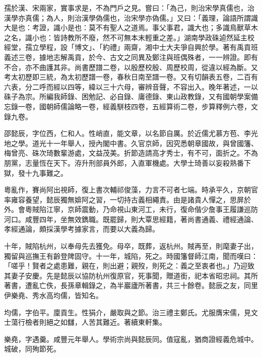 \begin{pinyinscope}
孺於漢、宋兩家，實事求是，不為門戶之見。嘗曰：「為己，則治宋學真儒也，治漢學亦真儒；為人，則治漢學偽儒也，治宋學亦偽儒。」又曰：「義理，論語所謂識大是也：考證，識小是也：莫不有聖人之道焉。事父事君，識大也；多識鳥獸草木之名，識小也：皆詩教所不廢，然不可無本末輕重之差。」湖南學政硃逌然延主校經堂，孺立學程，設「博文」、「約禮」兩齋，湘中士大夫爭自興於學。著有禹貢班義述三卷，據地志解禹貢，於今、古文之同異及鄭注與班偶殊者，一一辨證。即有不合，亦不曲護其非。尚書歷譜二卷，以殷歷校殷、周歷校周，從違以經為斷。又考太初歷即三統，為太初歷譜一卷，春秋日南至譜一卷。又有切韻表五卷，二百有六表，分二呼而經以四等，緯以三十六母，審辨音聲，不容出入。晚年著述，一以硃子為宗。所編我師錄、困勉記、必自錄、庸德錄、東山政教錄，又有國朝學案備忘錄一卷，國朝師儒論略一卷，經義駢枝四卷，五經算術二卷，步算釋例六卷，文錄九卷。

邵懿辰，字位西，仁和人。性峭直，能文章，以名節自厲。於近儒尤慕方苞、李光地之學。道光十一年舉人，授內閣中書。久官京師，因究悉朝章國故，與曾國籓、梅曾亮、硃次琦數輩游處，文益茂美。折節造請高才秀士，有不可，面折之。不為朋黨，志量恆在天下。洊升刑部員外郎，入直軍機處。大學士琦善以妄殺熟番下獄，發十九事難之。

粵亂作，賽尚阿出視師，復上書次輔祁俊藻，力言不可者七端。時承平久，京朝官率雍容養望，懿辰獨無媕阿之習，一切持古義相繩責。由是諸貴人憚之，思屏於外。會粵賊陷江寧，京師震動，乃命視山東河工，未行，復命偕少詹事王履謙巡防河口。咸豐四年，坐無效鐫職。既罷歸，則大覃思經籍，著尚書通義、禮經通論、孝經通論，頗採漢學考據家言，而要以大義為歸。

十年，賊陷杭州，以奉母先去獲免。母卒，既葬，返杭州。賊再至，則麾妻子出，獨留與巡撫王有齡登陴固守。十一年，城陷，死之。時國籓督師江南，聞而嘆曰：「嗟乎！賢者之處患難，親在，則出避；親歿，則死之：義之至衷者也。」乃迎致其妻子安慶。先是懿辰以協防杭州復原官，死事聞，贈道銜，祀本省昭忠祠。其所著書，遭亂亡佚，長孫章輯錄之，為半巖廬所著書，共三十餘卷。懿辰之友，同里伊樂堯、秀水高均儒，皆知名。

均儒，字伯平。廩貢生。性狷介，嚴取與之節。治三禮主鄭氏。尤服膺宋儒，見文士蕩行檢者則絕之如讎，人苦其難近。著續東軒集。

樂堯，字遇羹。咸豐元年舉人。學術宗尚與懿辰同。值寇亂，猶商證經義危城中。城破，同殉節死。


\end{pinyinscope}